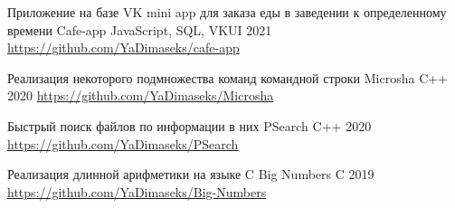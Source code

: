 

\begin{cventries}

  \cventry
  {Приложение на базе VK mini app для заказа еды в заведении к определенному времени} %
  {Cafe-app} %
  {JavaScript, SQL, VKUI} %
  {2021} %
  {\href{https://github.com/YaDimaseks/cafe-app}{https://github.com/YaDimaseks/cafe-app}}

  \begin{flushleft}
  \end{flushleft}

  \cventry
  {Реализация некоторого подмножества команд командной строки} %
  {Microsha} %
  {C++} %
  {2020} %
  {
    \href{https://github.com/YaDimaseks/Microsha}{https://github.com/YaDimaseks/Microsha}
  }

  \cventry
  {Быстрый поиск файлов по информации в них} %
  {PSearch} %
  {C++} %
  {2020} %
  {
    \href{https://github.com/YaDimaseks/PSearch}{https://github.com/YaDimaseks/PSearch}
  }

  \cventry
  {Реализация длинной арифметики на языке C} %
  {Big Numbers} %
  {C} %
  {2019} %
  {
    \href{https://github.com/YaDimaseks/Big-Numbers}{https://github.com/YaDimaseks/Big-Numbers}
  }

\end{cventries}
